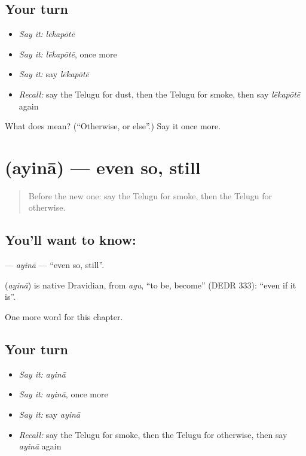 \subsection*{Your turn}
\begin{itemize}
\raggedright
  \item \emph{Say it:} \emph{lēkapōtē}
  \item \emph{Say it:} \emph{lēkapōtē}, once more
  \item \emph{Say it:} say \emph{lēkapōtē}
  \item \emph{Recall:} say the Telugu for dust, then the Telugu for smoke, then say \emph{lēkapōtē} again
\end{itemize}

\begin{tcolorbox}[breakable,colback=teal!4,colframe=teal!35!black,title={Before you move on}]
What does  mean? (\textquotedblleft{}Otherwise, or else\textquotedblright{}.) Say it once more.
\end{tcolorbox}
\section[\texorpdfstring{\te{అయినా} (ayinā)}{అయినా (ayinā)}]{ (ayinā) — even so, still}

\label{lesson:TE-C176-ayina}



\begin{quote}
Before the new one: say the Telugu for smoke, then the Telugu for otherwise.
\end{quote}

\subsection*{You'll want to know: }
\textbf{} — \emph{ayinā} — \textquotedblleft{}even so, still\textquotedblright{}.

\begin{cousinweb}
\textbf{} (\emph{ayinā}) is native Dravidian, from \emph{agu}, \textquotedblleft{}to be, become\textquotedblright{} (DEDR 333): \textquotedblleft{}even if it is\textquotedblright{}.
\end{cousinweb}

\begin{grammarlens}[title={What you've built}]
One more word for this chapter.
\end{grammarlens}

\subsection*{Your turn}
\begin{itemize}
\raggedright
  \item \emph{Say it:} \emph{ayinā}
  \item \emph{Say it:} \emph{ayinā}, once more
  \item \emph{Say it:} say \emph{ayinā}
  \item \emph{Recall:} say the Telugu for smoke, then the Telugu for otherwise, then say \emph{ayinā} again
\end{itemize}

